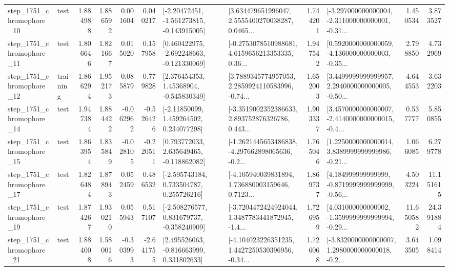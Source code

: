 \begin{tabular}{llrrrrllrlrr}
 step\_1751\_chromophore\_10 &      test &      1.884988 &    1.886592 &      0.001604 &  0.040217 &   [-2.20472451, -1.561273815, -0.143915005] &  [3.634479651996047, 2.5555400270038287, 0.0465... &       1.744201 &  [-3.297000000000004, -2.311000000000001, -0.31... &            1.450534 &          3.873527 \\
 step\_1751\_chromophore\_11 &      test &      1.806646 &    1.821667 &      0.015020 &  0.157958 &   [0.460422975, -2.692248663, -0.121330069] &  [-0.2753078510988681, 4.6159656213353335, 0.36... &       1.947542 &  [0.5920000000000059, -4.136000000000003, -0.35... &            2.798850 &          4.732969 \\
 step\_1751\_chromophore\_12 &  training &      1.866294 &    1.952173 &      0.085879 &  0.779828 &     [2.376454353, 1.45368904, -0.545830349] &  [3.7889345774957053, 2.2859924110583996, -0.74... &       1.652003 &  [3.4499999999999957, 2.2940000000000005, -0.50... &            4.644553 &          3.632203 \\
 step\_1751\_chromophore\_14 &      test &      1.947384 &    1.884422 &     -0.062962 & -0.526426 &     [-2.11850099, 1.459264502, 0.234077298] &  [-3.3519002352386633, 2.893752876326786, 0.443... &       1.903337 &  [3.4570000000000007, -2.4140000000000015, -0.4... &            0.537777 &          5.850855 \\
 step\_1751\_chromophore\_15 &      test &      1.863954 &    1.835849 &     -0.028105 & -0.220511 &    [0.793772033, 2.635649465, -0.118862082] &  [-1.2621445653486838, -4.297662898065636, -0.2... &       1.765046 &  [1.2250000000000014, 3.8389999999999986, -0.21... &            1.066085 &          6.279778 \\
 step\_1751\_chromophore\_17 &      test &      1.826484 &    1.878943 &      0.052459 &  0.486532 &    [-2.595743184, 0.733504787, 0.255726216] &  [-4.105940039831894, 1.736880003159646, 0.7123... &       1.869737 &  [4.184999999999999, -0.8719999999999999, -0.56... &            4.503224 &         11.151615 \\
 step\_1751\_chromophore\_19 &      test &      1.874267 &    1.930210 &      0.055943 &  0.517107 &   [-2.508276577, 0.831679737, -0.358240909] &  [-3.7204472424924044, 1.3487783441872945, -1.4... &       1.726959 &  [4.031000000000002, -1.3599999999999994, -0.29... &           11.650582 &         24.391884 \\
 step\_1751\_chromophore\_21 &      test &      1.884008 &    1.580016 &     -0.303993 & -2.641755 &    [2.495526063, -0.816663999, 0.331802633] &  [-4.104023226351235, 1.4427250530396956, -0.34... &       1.726068 &  [-3.8320000000000007, 1.2980000000000018, -0.2... &            3.643505 &          1.098414 \\

\end{tabular}
